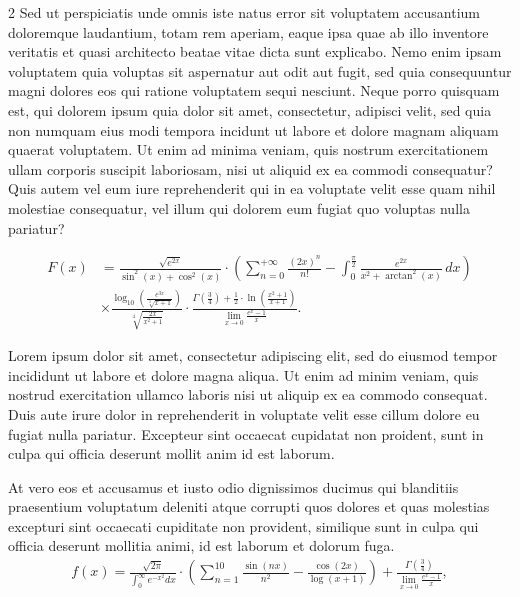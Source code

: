 \documentclass[a0,portrait]{a0poster}
\begin{document}
\begin{mdframed}[style=MyFrame]
\begin{multicols}{2}
Sed ut perspiciatis unde omnis iste natus error sit voluptatem accusantium doloremque laudantium, totam rem aperiam, eaque ipsa quae ab illo inventore veritatis et quasi architecto beatae vitae dicta sunt explicabo. Nemo enim ipsam voluptatem quia voluptas sit aspernatur aut odit aut fugit, sed quia consequuntur magni dolores eos qui ratione voluptatem sequi nesciunt. Neque porro quisquam est, qui dolorem ipsum quia dolor sit amet, consectetur, adipisci velit, sed quia non numquam eius modi tempora incidunt ut labore et dolore magnam aliquam quaerat voluptatem. Ut enim ad minima veniam, quis nostrum exercitationem ullam corporis suscipit laboriosam, nisi ut aliquid ex ea commodi consequatur? Quis autem vel eum iure reprehenderit qui in ea voluptate velit esse quam nihil molestiae consequatur, vel illum qui dolorem eum fugiat quo voluptas nulla pariatur?

\begin{align}
    F(x) &= \frac{\sqrt{e^{2x}}}{\sin^2(x) + \cos^2(x)} \cdot \left(\sum_{n=0}^{+\infty} \frac{(2x)^n}{n!} - \int_{0}^{\frac{\pi}{2}} \frac{e^{2x}}{x^2 + \arctan^2(x)} \, dx\right) \nonumber \\
        &\times\frac{\log_{10}\left(\frac{e^{3x}}{\sqrt[3]{x+1}}\right)}{\sqrt[4]{\frac{2x}{x^2 + 1}}} \cdot \frac{\Gamma\left(\frac{3}{4}\right) + \frac{1}{2} \cdot \ln\left(\frac{x^2 + 1}{x+1}\right)}{\lim_{{x \to 0}} \frac{e^x - 1}{x}}.
\end{align}

Lorem ipsum dolor sit amet, consectetur adipiscing elit, sed do eiusmod tempor incididunt ut labore et dolore magna aliqua. Ut enim ad minim veniam, quis nostrud exercitation ullamco laboris nisi ut aliquip ex ea commodo consequat. Duis aute irure dolor in reprehenderit in voluptate velit esse cillum dolore eu fugiat nulla pariatur. Excepteur sint occaecat cupidatat non proident, sunt in culpa qui officia deserunt mollit anim id est laborum.

At vero eos et accusamus et iusto odio dignissimos ducimus qui blanditiis praesentium voluptatum deleniti atque corrupti quos dolores et quas molestias excepturi sint occaecati cupiditate non provident, similique sunt in culpa qui officia deserunt mollitia animi, id est laborum et dolorum fuga.
%
\begin{equation}\label{eqn:L}
\begin{split}
	f(x) = \frac{\sqrt{2 \pi}}{\int_{0}^{\infty} e^{-x^2} dx} \cdot \left(\sum_{n=1}^{10} \frac{\sin(nx)}{n^2} - \frac{\cos(2x)}{\log(x+1)}\right) + \frac{\Gamma\left(\frac{3}{4}\right)}{\lim_{{x \to 0}} \frac{e^x - 1}{x}},
\end{split}
\end{equation}


\end{multicols}
\end{mdframed}
\end{document}

